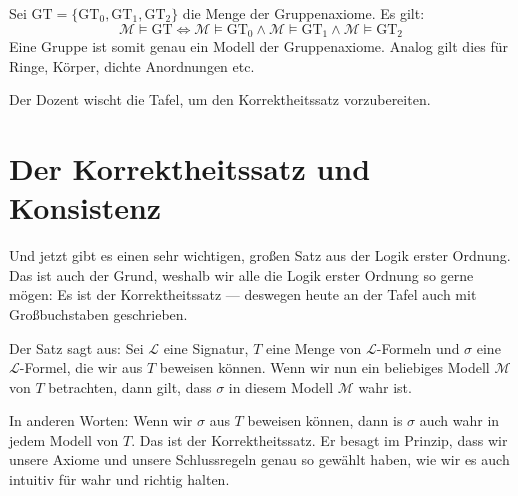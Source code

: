 \begin{math-stroke}
Sei $\text{GT} = \{\text{GT}_0, \text{GT}_1, \text{GT}_2\}$ die Menge der Gruppenaxiome. Es gilt:
\[ \mathcal{M} \models \text{GT} \iff \mathcal{M} \models \text{GT}_0 \land \mathcal{M} \models \text{GT}_1 \land \mathcal{M} \models \text{GT}_2 \]
Eine Gruppe ist somit genau ein Modell der Gruppenaxiome. Analog gilt dies für Ringe, Körper, dichte Anordnungen etc.
\end{math-stroke}

\begin{ai-global-state-checkpoint-invisible-content}
\end{ai-global-state-checkpoint-invisible-content}

\begin{lecture-break}[Tafelreinigung]
Der Dozent wischt die Tafel, um den Korrektheitssatz vorzubereiten.
\end{lecture-break}

\section{Der Korrektheitssatz und Konsistenz}

\begin{spoken-clean}[00:17:40 - 00:20:06]
Und jetzt gibt es einen sehr wichtigen, großen Satz aus der Logik erster Ordnung. Das ist auch der Grund, weshalb wir alle die Logik erster Ordnung so gerne mögen: Es ist der Korrektheitssatz --- deswegen heute an der Tafel auch mit Großbuchstaben geschrieben.

Der Satz sagt aus: Sei $\mathcal{L}$ eine Signatur, $T$ eine Menge von $\mathcal{L}$-Formeln und $\sigma$ eine $\mathcal{L}$-Formel, die wir aus $T$ beweisen können. Wenn wir nun ein beliebiges Modell $\mathcal{M}$ von $T$ betrachten, dann gilt, dass $\sigma$ in diesem Modell $\mathcal{M}$ wahr ist.

In anderen Worten: Wenn wir $\sigma$ aus $T$ beweisen können, dann is $\sigma$ auch wahr in jedem Modell von $T$. Das ist der Korrektheitssatz. Er besagt im Prinzip, dass wir unsere Axiome und unsere Schlussregeln genau so gewählt haben, wie wir es auch intuitiv für wahr und richtig halten.
\end{spoken-clean}

